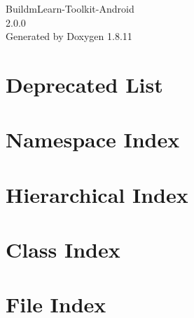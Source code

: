 \documentclass[twoside]{book}
\newcommand{\+}{\discretionary{\mbox{\scriptsize$\hookleftarrow$}}{}{}}
\newcommand{\clearemptydoublepage}{%
  \newpage{\pagestyle{empty}\cleardoublepage}%
}
\begin{document}
\hypersetup{pageanchor=false,
             bookmarksnumbered=true,
             pdfencoding=unicode
            }
\begin{titlepage}
\vspace*{7cm}
\begin{center}%
{\Large Buildm\+Learn-\/\+Toolkit-\/\+Android \\[1ex]\large 2.\+0.\+0 }\\
\vspace*{1cm}
{\large Generated by Doxygen 1.8.11}\\
\end{center}
\end{titlepage}
\clearemptydoublepage
\tableofcontents
\clearemptydoublepage
{}
\hypersetup{pageanchor=true}

\chapter{Deprecated List}
\label{deprecated}
\hypertarget{deprecated}{}

\chapter{Namespace Index}

\chapter{Hierarchical Index}

\chapter{Class Index}

\chapter{File Index}

\end{document}
